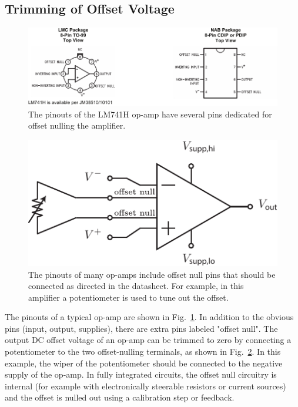 \subsection{Trimming of Offset Voltage}
\begin{figure}[tb]
\centering
\includegraphics[width=1\columnwidth]{lm741_pinout}
\caption{The pinouts of the LM741H op-amp have several pins dedicated for offset nulling the amplifier.} \label{fig:lm741_pinout}
\end{figure}
\begin{figure}[tb]
\centering
\includegraphics[scale=1]{opamp_pinout_offset}
\caption{The pinouts of many op-amps include offset null pins that should be connected as directed in the datasheet.  For example, in this amplifier a potentiometer is used to tune out the offset.} \label{fig:opamp_pinout_offset}
\end{figure}
The pinouts of a typical op-amp are shown in Fig.~\ref{fig:lm741_pinout}.  In addition to the obvious pins (input, output, supplies), there are extra pins labeled "offset null".   The output DC offset voltage of an op-amp can be trimmed to zero by connecting a potentiometer to the two offset-nulling terminals, as shown in Fig.~\ref{fig:opamp_pinout_offset}. In this example, the wiper of the potentiometer should be connected to the negative supply of the op-amp.  In fully integrated circuits, the offset null circuitry is internal (for example with electronically steerable resistors or current sources) and the offset is nulled out using a calibration step or feedback.  
